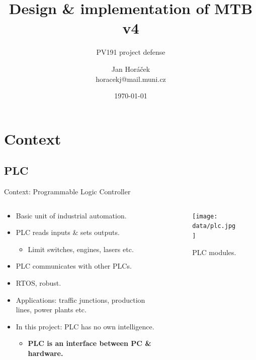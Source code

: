 \documentclass[aspectratio=169]{beamer}
\title[MTB v4]{Design \& implementation of MTB v4}
\subtitle{PV191 project defense}
\author[J. Horáček]{Jan Horáček\texorpdfstring{\\}{, }horacekj@mail.muni.cz}
\institute[FI MU]{Faculty of Informatics Masaryk University}
\date{\today}
\begin{document}
\begin{frame}[plain]
\maketitle
\end{frame}

\section{Context}
\subsection{PLC}


\begin{frame}{Context: Programmable Logic Controller}
\begin{columns}
	\begin{column}{.6\textwidth}
		\begin{itemize}
		\item Basic unit of industrial automation.
		\item PLC reads inputs \& sets outputs.
			\begin{itemize}
			\item Limit switches, engines, lasers etc.
		\end{itemize}
		\item PLC communicates with other PLCs.
		\item RTOS, robust.
		\item Applications: traffic junctions, production lines, power plants etc.
		\item In this project: PLC has no own intelligence.
		\begin{itemize}
		\item \textbf{PLC is an interface between PC \& hardware.}
		\end{itemize}
		\end{itemize}
	\end{column}
	\begin{column}{.4\textwidth}
		\begin{figure}
		\texttt{[image: data/plc.jpg]}
		\caption{PLC modules.}
		\end{figure}
	\end{column}
\end{columns}
\end{frame}

\end{document}
